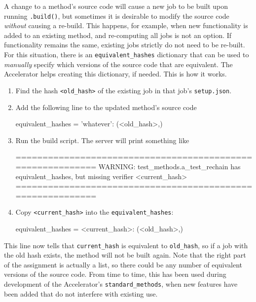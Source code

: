 A change to a method's source code will cause a new job to be built
upon running \texttt{.build()}, but sometimes it is
desirable to modify the source code \textsl{without} causing a
re-build.  This happens, for example, when new functionality is added
to an existing method, and re-computing all jobs is not an option.  If
functionality remains the same, existing jobs strictly do not need to
be re-built.  For this situation, there is an
\texttt{equivalent\_hashes} dictionary that can be used to \textsl{manually} specify
which versions of the source code that are equivalent.  The
Accelerator helps creating this dictionary, if needed.  This is how it
works.
\begin{enumerate}
\item Find the hash \texttt{<old\_hash>} of the existing job in that
  job's \texttt{setup.json}.
\item Add the following line to the updated method's source code
\begin{python}
equivalent_hashes = {'whatever': (<old_hash>,)}
\end{python}
\item Run the build script.  The server will print something like
\begin{shell}
===========================================================
WARNING: test_methods.a_test_rechain has equivalent_hashes,
but missing verifier <current_hash>
===========================================================
\end{shell}
\item Copy \texttt{<current\_hash>} into the
  \texttt{equivalent\_hashes}:
\begin{python}
equivalent_hashes = {<current_hash>: (<old_hash>,)}
\end{python}
\end{enumerate}
This line now tells that \texttt{current\_hash} is equivalent to
\texttt{old\_hash}, so if a job with the old hash exists, the method
will not be built again.  Note that the right part of the assignment
is actually a list, so there could be any number of equivalent
versions of the source code.  From time to time, this has been used
during development of the Accelerator's \texttt{standard\_methods},
when new features have been added that do not interfere with existing
use.


